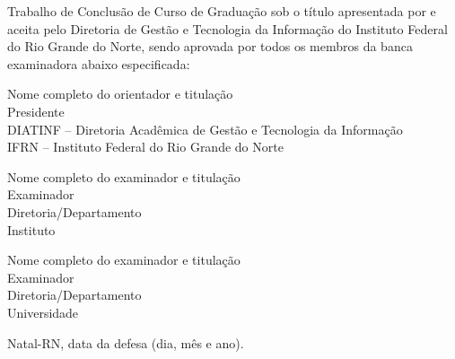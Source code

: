 \begin{folhadeaprovacao}
	\setlength{\ABNTsignthickness}{0.4pt}
	\setlength{\ABNTsignwidth}{10cm}
	
	\noindent 
	Trabalho de Conclusão de Curso de Graduação sob o título
	\textit{\myThesis} apresentada por \myName{ }e aceita pelo Diretoria
	de Gestão e Tecnologia da Informação do Instituto Federal do Rio Grande do
	Norte, sendo aprovada por todos os membros da banca examinadora abaixo especificada:
		
	\assinatura
	{
		Nome completo do orientador e titulação   			                  \\
		{\small Presidente}											          \smallskip\\ 
		{\footnotesize
			DIATINF -- Diretoria Acadêmica de Gestão e Tecnologia da Informação		   \\
		  	IFRN -- Instituto Federal do Rio Grande do Norte
		}
   }
      
   \assinatura
	{
      Nome completo do examinador e titulação   			                  \\
		{\small Examinador}											          \smallskip\\ 
		{\footnotesize
			Diretoria/Departamento		\\
		  	Instituto
		}
   }   
   
   \assinatura
	{
      Nome completo do examinador e titulação   			                  \\
		{\small Examinador}											          \smallskip\\ 
		{\footnotesize
			Diretoria/Departamento		\\
		  	Universidade
		}
	}
		
	\vfill
	
	\begin{center}
		Natal-RN, data da defesa (dia, mês e ano).
	\end{center}
\end{folhadeaprovacao}
